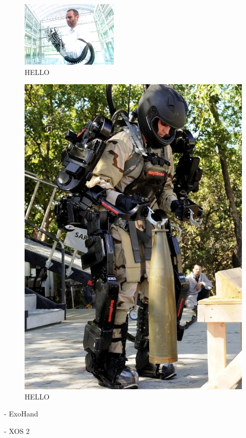 \documentclass[letterpaper, 10 pt, conference]{ieeeconf}  %
\begin{document}
\begin{figure}[H]
  \centering
    \includegraphics[width=0.41\textwidth]{img/exohand}
  \caption{HELLO}
\end{figure}

\begin{figure}[H]
  \centering
    \includegraphics[scale=0.3]{img/xos2}
  \caption{HELLO}
\end{figure}

- ExoHand

- XOS 2
\end{document}

